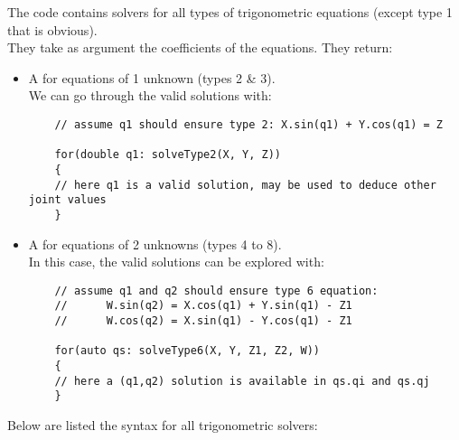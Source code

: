\documentclass{ecnreport}
\begin{document}
  The code contains solvers for all types of trigonometric equations (except type 1 that is obvious).\\
  They take as argument the coefficients of the equations. They return:
  \begin{itemize}
    \item A  for equations of 1 unknown (types 2 \& 3).\\We can go through the valid solutions with:
    \cppstyle
    \begin{lstlisting}
    // assume q1 should ensure type 2: X.sin(q1) + Y.cos(q1) = Z
    
    for(double q1: solveType2(X, Y, Z))
    {
    // here q1 is a valid solution, may be used to deduce other joint values
    }
    \end{lstlisting}
    \item A  for equations of 2 unknowns (types 4 to 8).\\In this case, the valid solutions can be explored with:
    \cppstyle
    \begin{lstlisting}
    // assume q1 and q2 should ensure type 6 equation: 
    //		W.sin(q2) = X.cos(q1) + Y.sin(q1) - Z1
    //		W.cos(q2) = X.sin(q1) - Y.cos(q1) - Z1
    
    for(auto qs: solveType6(X, Y, Z1, Z2, W))
    {
    // here a (q1,q2) solution is available in qs.qi and qs.qj
    }
    \end{lstlisting}
  \end{itemize}
  
  \newpage
  Below are listed the syntax for all trigonometric solvers:\\
  
\end{document}
